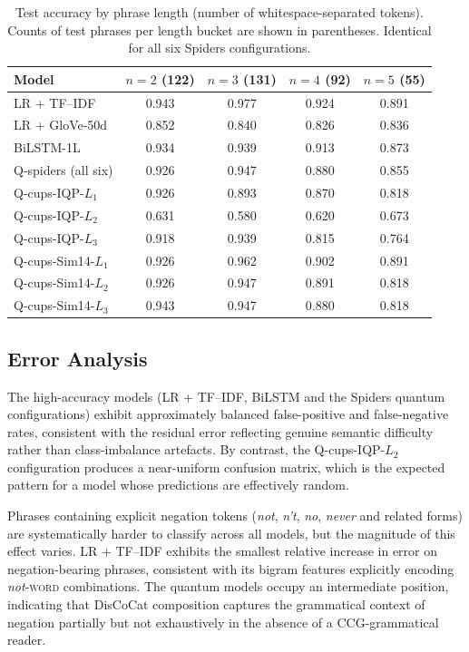 \documentclass[11pt, a4paper]{article}
\begin{document}
\begin{table}[H]
\centering
\caption{Test accuracy by phrase length (number of whitespace-separated
tokens). Counts of test phrases per length bucket are shown in
parentheses. Identical for all six Spiders configurations.}
\label{tab:perlength}
\small
\begin{tabular}{lcccc}
\toprule
Model & $n=2$ (122) & $n=3$ (131) & $n=4$ (92) & $n=5$ (55) \\
\midrule
LR + TF--IDF             & 0.943 & 0.977 & 0.924 & 0.891 \\
LR + GloVe-50d           & 0.852 & 0.840 & 0.826 & 0.836 \\
BiLSTM-1L                & 0.934 & 0.939 & 0.913 & 0.873 \\
\midrule
Q-spiders (all six)      & 0.926 & 0.947 & 0.880 & 0.855 \\
\midrule
Q-cups-IQP-\(L_1\)       & 0.926 & 0.893 & 0.870 & 0.818 \\
Q-cups-IQP-\(L_2\)       & 0.631 & 0.580 & 0.620 & 0.673 \\
Q-cups-IQP-\(L_3\)       & 0.918 & 0.939 & 0.815 & 0.764 \\
Q-cups-Sim14-\(L_1\)     & 0.926 & 0.962 & 0.902 & 0.891 \\
Q-cups-Sim14-\(L_2\)     & 0.926 & 0.947 & 0.891 & 0.818 \\
Q-cups-Sim14-\(L_3\)     & 0.943 & 0.947 & 0.880 & 0.818 \\
\bottomrule
\end{tabular}
\end{table}

\subsection{Error Analysis}

The high-accuracy models (LR + TF--IDF, BiLSTM and the Spiders
quantum configurations) exhibit approximately balanced false-positive
and false-negative rates, consistent with the residual error
reflecting genuine semantic difficulty rather than class-imbalance
artefacts. By contrast, the Q-cups-IQP-\(L_2\) configuration produces
a near-uniform confusion matrix, which is the expected pattern for a model
whose predictions are effectively random.

Phrases containing explicit negation tokens (\emph{not}, \emph{n't},
\emph{no}, \emph{never} and related forms) are systematically harder
to classify across all models, but the magnitude of this effect
varies. LR + TF--IDF exhibits the smallest relative increase in error
on negation-bearing phrases, consistent with its bigram features
explicitly encoding \emph{not}-\textsc{word} combinations. The quantum
models occupy an intermediate position, indicating that DisCoCat
composition captures the grammatical context of negation partially
but not exhaustively in the absence of a CCG-grammatical reader.
\end{document}
